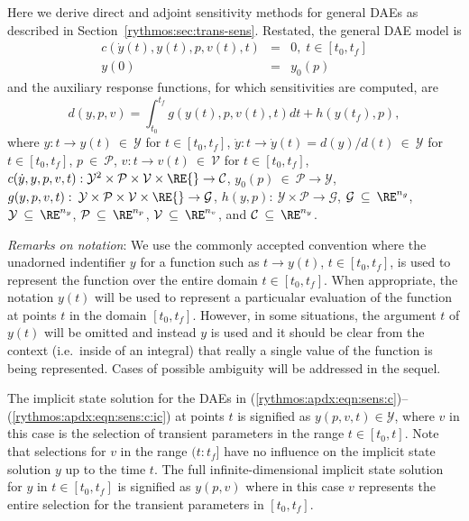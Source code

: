 \documentclass[pdf,ps2pdf,11pt]{SANDreport}
\begin{document}
Here we derive direct and adjoint sensitivity methods for general DAEs as
described in Section~\ref{rythmos:sec:trans-sens}.  Restated, the general DAE
model is
%
\begin{eqnarray}
c\left( \dot{y}(t), y(t), p, v(t), t \right) & = & 0,
\; t \in \left[ t_0, t_f \right] \label{rythmos:apdx:eqn:sens:c} \\
y(0) & = & y_0(p) \label{rythmos:apdx:eqn:sens:c:ic}
\end{eqnarray}
%
and the auxiliary response functions, for which sensitivities are computed, are
%
\begin{equation}
d(y,p,v)
= \int_{t_0}^{t_f} g(y(t),p,v(t),t) dt + h(y(t_f),p),
\label{rythmos:apdx:eqn:sens:d}
\end{equation}
%
where $y: t {}\rightarrow y(t){}\:\in\:\mathcal{Y}$ for $t\in[t_0,t_f]$,
$\dot{y}: t {}\rightarrow \dot{y}(t) = d(y)/d(t)\:\in\:\mathcal{Y}$ for
$t\in[t_0,t_f]$, $p{}\:\in\:\mathcal{P}$, $v: t {}\rightarrow
v(t){}\:\in\:\mathcal{V}$ for $t\in[t_0,t_f]$, $c(\dot{y}, y, p, v, t)
:{}\mathcal{Y}^2{}\times{}\mathcal{P}{}\times{}\mathcal{V}{}\times{}\RE
{}\rightarrow{}\mathcal{C}$,
$y_0(p){}\:\in\:\mathcal{P}{}\rightarrow{}\mathcal{Y}$, $g(y,p,v,t) :{}\:
{}\mathcal{Y}{}\times{}\mathcal{P}{}\times{}\mathcal{V}{}\times{}\RE
{}\rightarrow{}\mathcal{G}$, $h(y,p) :{}\: {}\mathcal{Y}{}\times{}\mathcal{P}
{}\rightarrow{}\mathcal{G}$, $\mathcal{G}{}\:\subseteq\:\RE^{n_g}$,
$\mathcal{Y}{}\:\subseteq\:\RE^{n_y}$, $\mathcal{P}{}\:\subseteq\:\RE^{n_p}$,
$\mathcal{V}{}\:\subseteq\:\RE^{n_v}$, and
$\mathcal{C}{}\:\subseteq\:\RE^{n_y}$.

{}\textit{Remarks on notation}: We use the commonly accepted convention where
the unadorned indentifier $y$ for a function such as $t {}\rightarrow y(t)$,
$t\in[t_0,t_f]$, is used to represent the function over the entire domain
$t\in[t_0,t_f]$.  When appropriate, the notation $y(t)$ will be used to
represent a particualar evaluation of the function at points $t$ in the domain
$[t_0,t_f]$.  However, in some situations, the argument $t$ of $y(t)$ will be
omitted and instead $y$ is used and it should be clear from the context (i.e.\
inside of an integral) that really a single value of the function is being
represented.  Cases of possible ambiguity will be addressed in the sequel.

The implicit state solution for the DAEs in
(\ref{rythmos:apdx:eqn:sens:c})--(\ref{rythmos:apdx:eqn:sens:c:ic}) at points
$t$ is signified as $y(p,v,t)\in\mathcal{Y}$, where $v$ in this case is the
selection of transient parameters in the range $t\in[t_0,t]$.  Note that
selections for $v$ in the range $(t:t_f]$ have no influence on the implicit
state solution $y$ up to the time $t$.  The full infinite-dimensional implicit
state solution for $y$ in $t\in[t_0,t_f]$ is signified as $y(p,v)$ where in
this case $v$ represents the entire selection for the transient parameters in
$[t_0,t_f]$.
\end{document}
